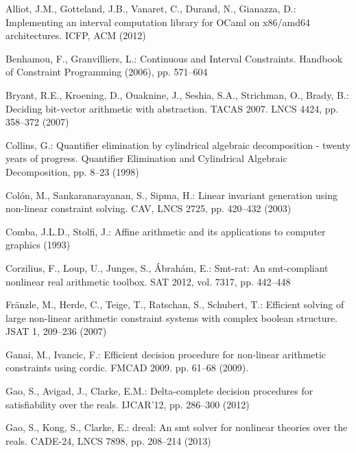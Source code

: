 \documentclass[runningheads,a4paper,oribibl]{llncs}
\begin{document}

%
\begin{thebibliography}{10}
\providecommand{\url}[1]{\texttt{#1}}
\providecommand{\urlprefix}{URL }

Alliot, J.M., Gotteland, J.B., Vanaret, C., Durand, N., Gianazza, D.:
  {Implementing an interval computation library for OCaml on x86/amd64
  architectures}. {ICFP}, ACM (2012)

Benhamou, F., Granvilliers, L.: {Continuous and Interval Constraints}. {Handbook of Constraint Programming} (2006), pp.
  571--604

Bryant, R.E., Kroening, D., Ouaknine, J., Seshia, S.A., Strichman, O., Brady,
  B.: Deciding bit-vector arithmetic with abstraction. TACAS 2007.
  LNCS 4424, pp. 358--372 (2007)

Collins, G.: Quantifier elimination by cylindrical algebraic decomposition - twenty years of progress. Quantifier Elimination and Cylindrical
  Algebraic Decomposition, pp. 8--23 (1998)

Colón, M., Sankaranarayanan, S., Sipma, H.: Linear invariant generation using
  non-linear constraint solving. 
  CAV, LNCS 2725, pp. 420--432
  (2003)
  
Comba, J.L.D., Stolfi, J.: Affine arithmetic and its applications to computer
  graphics (1993)

Corzilius, F., Loup, U., Junges, S., Ábrahám, E.: Smt-rat: An smt-compliant
  nonlinear real arithmetic toolbox. SAT 2012, vol. 7317, pp. 442--448

Fränzle, M., Herde, C., Teige, T., Ratschan, S., Schubert, T.: Efficient
  solving of large non-linear arithmetic constraint systems with complex
  boolean structure. JSAT 1,  209--236 (2007)

Ganai, M., Ivancic, F.: Efficient decision procedure for non-linear arithmetic
  constraints using cordic.
  FMCAD 2009. pp. 61--68 (2009).

Gao, S., Avigad, J., Clarke, E.M.: Delta-complete decision procedures for
  satisfiability over the reals. IJCAR'12, pp. 286--300 (2012)

Gao, S., Kong, S., Clarke, E.: dreal: An smt solver for nonlinear theories over
  the reals. CADE-24, LNCS 7898, pp. 208--214 (2013)


\end{thebibliography}
\end{document}
